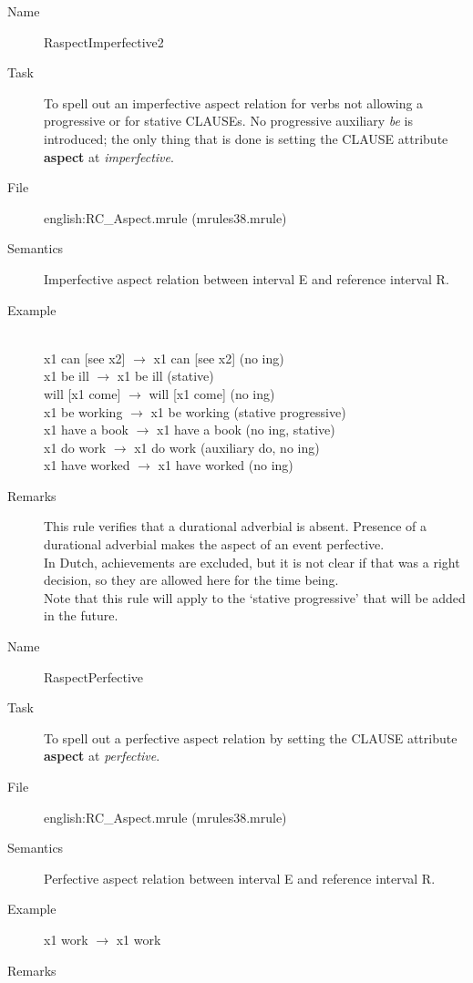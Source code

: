 \begin{description}
\vspace{1 cm}
\begin{description}
\item[Name]   RaspectImperfective2
\item[Task] To spell out an imperfective aspect relation for verbs not allowing 
a progressive or for stative CLAUSEs. No progressive auxiliary {\em be\/} is 
introduced; the only thing that is done is setting the CLAUSE attribute {\bf
aspect} at {\em imperfective\/}.
\item[File] english:RC\_Aspect.mrule (mrules38.mrule)
\item[Semantics] Imperfective aspect relation between interval E and reference 
interval R.
\item[Example] \mbox{}\\
x1 can [see x2] $\rightarrow$ x1 can [see x2] (no ing)\\
x1 be ill $\rightarrow$ x1 be ill (stative)\\
will [x1 come] $\rightarrow$ will [x1 come] (no ing)\\
x1 be working $\rightarrow$ x1 be working (stative progressive)\\
x1 have a book $\rightarrow$ x1 have a book (no ing, stative)\\
x1 do work $\rightarrow$ x1 do work (auxiliary do, no ing)\\
x1 have worked $\rightarrow$ x1 have worked (no ing)
\item[Remarks] 
This rule verifies that a durational adverbial is absent. Presence of a 
durational adverbial makes the aspect of an event perfective.\\
In Dutch, achievements are excluded, but it is not clear if that was a right 
decision, so they are allowed here for the time being.\\
Note that this rule will apply to the `stative progressive' that will be added 
in the future.
\end{description}

\vspace{1 cm}
\begin{description}
\item[Name] RaspectPerfective
\item[Task] To spell out a perfective aspect relation by setting the CLAUSE 
attribute {\bf aspect} at {\em perfective\/}.
\item[File] english:RC\_Aspect.mrule (mrules38.mrule)
\item[Semantics] Perfective aspect relation between interval E and reference 
interval R.
\item[Example] x1 work $\rightarrow$ x1 work
\item[Remarks] 
\end{description}


\end{description}
